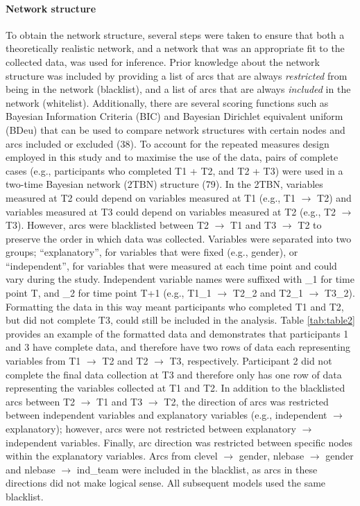 \documentclass[
  english,
  man]{apa6}
\let\oldparagraph\paragraph
\renewcommand{\paragraph}[1]{\oldparagraph{#1}\mbox{}}
\begin{document}
\hypertarget{network-structure}{%
\paragraph{Network structure}\label{network-structure}}

To obtain the network structure, several steps were taken to ensure that both a theoretically realistic network, and a network that was an appropriate fit to the collected data, was used for inference.
Prior knowledge about the network structure was included by providing a list of arcs that are always \emph{restricted} from being in the network (blacklist), and a list of arcs that are always \emph{included} in the network (whitelist).
Additionally, there are several scoring functions such as Bayesian Information Criteria (BIC) and Bayesian Dirichlet equivalent uniform (BDeu) that can be used to compare network structures with certain nodes and arcs included or excluded (38).
To account for the repeated measures design employed in this study and to maximise the use of the data, pairs of complete cases (e.g., participants who completed T1 + T2, and T2 + T3) were used in a two-time Bayesian network (2TBN) structure (79).
In the 2TBN, variables measured at T2 could depend on variables measured at T1 (e.g., T1 \(\rightarrow\) T2) and variables measured at T3 could depend on variables measured at T2 (e.g., T2 \(\rightarrow\) T3).
However, arcs were blacklisted between T2 \(\rightarrow\) T1 and T3 \(\rightarrow\) T2 to preserve the order in which data was collected.
Variables were separated into two groups; ``explanatory'', for variables that were fixed (e.g., gender), or ``independent'', for variables that were measured at each time point and could vary during the study.
Independent variable names were suffixed with \_1 for time point T, and \_2 for time point T+1 (e.g., T1\_1 \(\rightarrow\) T2\_2 and T2\_1 \(\rightarrow\) T3\_2).
Formatting the data in this way meant participants who completed T1 and T2, but did not complete T3, could still be included in the analysis.
Table \ref{tab:table2} provides an example of the formatted data and demonstrates that participants 1 and 3 have complete data, and therefore have two rows of data each representing variables from T1 \(\rightarrow\) T2 and T2 \(\rightarrow\) T3, respectively.
Participant 2 did not complete the final data collection at T3 and therefore only has one row of data representing the variables collected at T1 and T2.
In addition to the blacklisted arcs between T2 \(\rightarrow\) T1 and T3 \(\rightarrow\) T2, the direction of arcs was restricted between independent variables and explanatory variables (e.g., independent \(\rightarrow\) explanatory); however, arcs were not restricted between explanatory \(\rightarrow\) independent variables.
Finally, arc direction was restricted between specific nodes within the explanatory variables.
Arcs from clevel \(\rightarrow\) gender, nlebase \(\rightarrow\) gender and nlebase \(\rightarrow\) ind\_team were included in the blacklist, as arcs in these directions did not make logical sense.
All subsequent models used the same blacklist.
\end{document}
